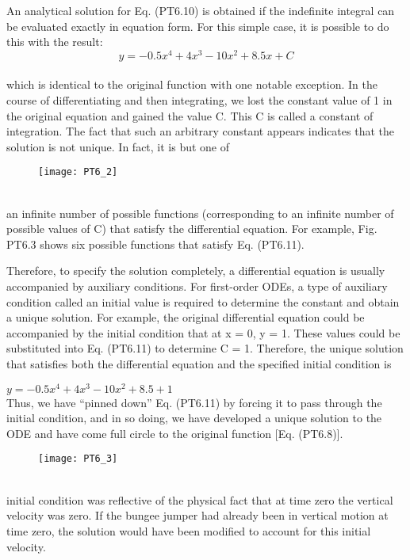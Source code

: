 \documentclass[../main.tex]{subfiles}
\begin{document}
An analytical solution for Eq. (PT6.10) is obtained if the indefinite integral can be evaluated exactly in equation form. For this simple case, it is possible to do this with the result:\\
\begin{equation}
\tag{PT6.11}
y=-0.5x^4 + 4x^3 - 10x^2 + 8.5x + C
\end{equation}\\
which is identical to the original function with one notable exception. In the course of differentiating and then integrating, we lost the constant value of 1 in the original equation
and gained the value C. This C is called a constant of integration. The fact that such an
arbitrary constant appears indicates that the solution is not unique. In fact, it is but one of\\
\pagebreak
\begin{figure}[hbt!]
	\texttt{[image: PT6\_2]}
	\label{PT6.2}
\end{figure}\\
an infinite number of possible functions (corresponding to an infinite number of possible
values of C) that satisfy the differential equation. For example, Fig. PT6.3 shows six possible functions that satisfy Eq. (PT6.11).

Therefore, to specify the solution completely, a differential equation is usually accompanied by auxiliary conditions. For first-order ODEs, a type of auxiliary condition called
an initial value is required to determine the constant and obtain a unique solution. For
example, the original differential equation could be accompanied by the initial condition
that at x = 0, y = 1. These values could be substituted into Eq. (PT6.11) to determine
C = 1. Therefore, the unique solution that satisfies both the differential equation and the
specified initial condition is

$y=-0.5x^4 + 4x^3 - 10x^2 + 8.5 + 1$\\
Thus, we have “pinned down” Eq. (PT6.11) by forcing it to pass through the initial condition, and in so doing, we have developed a unique solution to the ODE and have come full
circle to the original function [Eq. (PT6.8)].\\
\begin{figure}[hbt!]
	\texttt{[image: PT6\_3]}
	\label{PT6.3}
\end{figure}\\
initial condition was reflective of the physical fact that at time zero the vertical velocity
was zero. If the bungee jumper had already been in vertical motion at time zero, the solution would have been modified to account for this initial velocity.
\end{document}
